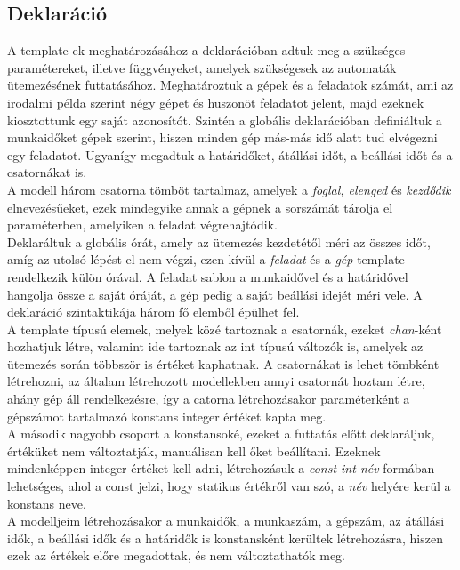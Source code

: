 \documentclass [12pt]{report}
\begin{document}
    \subsection{Deklaráció}
     A template-ek meghatározásához a deklarációban adtuk meg a szükséges paramétereket, illetve függvényeket, amelyek szükségesek az automaták ütemezésének futtatásához. Meghatároztuk a gépek és a feladatok számát, ami az irodalmi példa szerint négy gépet és huszonöt feladatot jelent, majd ezeknek kiosztottunk egy saját azonosítót. Szintén a globális deklarációban definiáltuk a munkaidőket gépek szerint, hiszen minden gép más-más idő alatt tud elvégezni egy feladatot. Ugyanígy megadtuk a határidőket, átállási időt, a beállási időt és a csatornákat is.\\
     A modell három csatorna tömböt tartalmaz, amelyek a \emph{foglal, elenged} és \emph{kezdődik} elnevezésűeket, ezek mindegyike annak a gépnek a sorszámát tárolja el paraméterben, amelyiken a feladat végrehajtódik.\\ 
      Deklaráltuk a globális órát, amely az ütemezés kezdetétől méri az összes időt, amíg az utolsó lépést el nem végzi, ezen kívül a \emph{feladat} és a \emph{gép} template rendelkezik külön órával. A feladat sablon a munkaidővel és a határidővel hangolja össze a saját óráját, a gép pedig a saját beállási idejét méri vele. 
      A deklaráció szintaktikája három fő elemből épülhet fel.\\
       A template típusú elemek, melyek közé tartoznak a csatornák, ezeket \emph{chan}-ként hozhatjuk létre, valamint ide tartoznak az int típusú változók is, amelyek az ütemezés során többször is értéket kaphatnak. A csatornákat is lehet tömbként létrehozni, az általam létrehozott modellekben annyi csatornát hoztam létre, ahány gép áll rendelkezésre, így a catorna létrehozásakor paraméterként a gépszámot tartalmazó konstans integer értéket kapta meg. \\
      A második nagyobb csoport a konstansoké, ezeket a futtatás előtt deklaráljuk, értéküket nem változtatják, manuálisan kell őket beállítani. Ezeknek mindenképpen integer értéket kell adni, létrehozásuk a \emph{const int név} formában lehetséges, ahol a const jelzi, hogy statikus értékről van szó, a \emph{név} helyére kerül a konstans neve.\\
       A modelljeim létrehozásakor a munkaidők, a munkaszám, a gépszám, az átállási idők, a beállási idők és a határidők is konstansként kerültek létrehozásra, hiszen ezek az értékek előre megadottak, és nem változtathatók meg.\\
\end{document}
